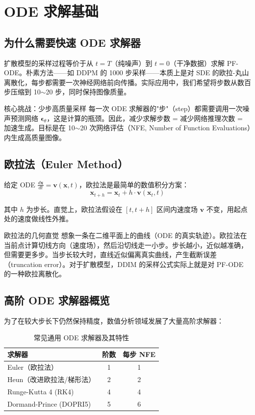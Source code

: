 \section{ODE 求解基础}

\subsection{为什么需要快速 ODE 求解器}

扩散模型的采样过程等价于从 $t=T$（纯噪声）到 $t=0$（干净数据）求解 PF-ODE。朴素方法——如 DDPM 的 1000 步采样——本质上是对 SDE 的欧拉-丸山离散化，每步都需要一次神经网络前向传播。实际应用中，我们希望将步数从数百步压缩到 10$\sim$20 步，同时保持图像质量。

\begin{importantbox}{核心挑战：少步高质量采样}
每一次 ODE 求解器的"步"（step）都需要调用一次噪声预测网络 $\boldsymbol{\epsilon}_\theta$，这是计算的瓶颈。因此，减少求解步数 = 减少网络推理次数 = 加速生成。目标是在 10$\sim$20 次网络评估（NFE, Number of Function Evaluations）内生成高质量图像。
\end{importantbox}

\subsection{欧拉法（Euler Method）}

给定 ODE $\frac{d\mathbf{x}}{dt} = \mathbf{v}(\mathbf{x}, t)$，欧拉法是最简单的数值积分方案：
$$\mathbf{x}_{t+h} = \mathbf{x}_t + h \cdot \mathbf{v}(\mathbf{x}_t, t)$$

其中 $h$ 为步长。直觉上，欧拉法假设在 $[t, t+h]$ 区间内速度场 $\mathbf{v}$ 不变，用起点处的速度做线性外推。

\begin{knowledgebox}{欧拉法的几何直觉}
想象一条在二维平面上的曲线（ODE 的真实轨迹）。欧拉法在当前点计算切线方向（速度场），然后沿切线走一小步。步长越小，近似越准确，但需要更多步。当步长较大时，直线近似偏离真实曲线，产生截断误差（truncation error）。对于扩散模型，DDIM 的采样公式实际上就是对 PF-ODE 的一种欧拉离散化。
\end{knowledgebox}

\subsection{高阶 ODE 求解器概览}

为了在较大步长下仍然保持精度，数值分析领域发展了大量高阶求解器：

\begin{table}[H]
\centering
\begin{tabular}{lcc}
\toprule
\textbf{求解器} & \textbf{阶数} & \textbf{每步 NFE} \\
\midrule
Euler（欧拉法） & 1 & 1 \\
Heun（改进欧拉法/梯形法） & 2 & 2 \\
Runge-Kutta 4 (RK4) & 4 & 4 \\
Dormand-Prince (DOPRI5) & 5 & 6 \\
\bottomrule
\end{tabular}
\caption{常见通用 ODE 求解器及其特性}
\end{table}

